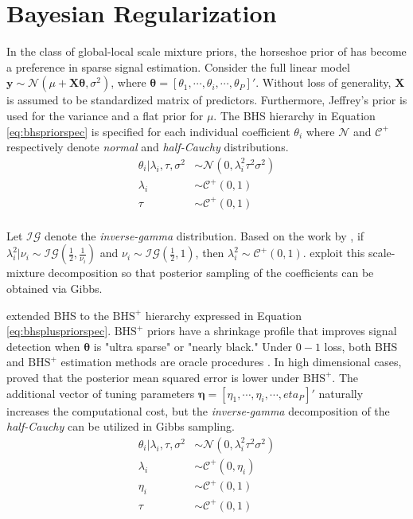 \section{Bayesian Regularization}
\label{sec:bayesreg}
In the class of global-local scale mixture priors, the horseshoe prior of \cite{Carvalho2010} has become a preference in sparse signal estimation. Consider the full linear model $\bm{y}\sim \mathcal{N}(\mu+\bm{X}\bm{\theta},\sigma^2)$, where $\bm{\theta}=[\theta_1, \cdots, \theta_i,\cdots, \theta_P]'$. Without loss of generality,  $\bm{X}$ is assumed to be standardized matrix of predictors. Furthermore, Jeffrey's prior is used for the variance and a flat prior for $\mu$. The BHS hierarchy in Equation \ref{eq:bhspriorspec} is specified for each individual coefficient $\theta_i$ where $\mathcal{N}$ and $\mathcal{C}^+$ respectively denote \textit{normal} and \textit{half-Cauchy} distributions.
\begin{equation}
\label{eq:bhspriorspec}
\begin{split}
	\theta_i|\lambda_i,\tau,\sigma^2 & \sim \mathcal{N}(0,\lambda^2_i\tau^2\sigma^2) \\
	\lambda_i &\sim \mathcal{C}^+(0,1)\\
	\tau &\sim \mathcal{C}^+(0,1)\\
\end{split}
\end{equation}

Let $\mathcal{IG}$ denote the \textit{inverse-gamma} distribution. Based on the work by \cite{Wand2011}, if $\lambda_i^2|\nu_i\sim \mathcal{IG}(\frac{1}{2},\frac{1}{\nu_i})$ and $\nu_i \sim \mathcal{IG}(\frac{1}{2},1)$, then $\lambda_i^2 \sim \mathcal{C}^+(0,1)$. \cite{Makalic2016b} exploit this scale-mixture decomposition so that posterior sampling of the coefficients can be obtained via Gibbs.

\cite{Bhadra2016} extended BHS to the $\textrm{BHS}^+$ hierarchy expressed in Equation \ref{eq:bhspluspriorspec}. $\textrm{BHS}^+$ priors have a shrinkage profile that improves signal detection when $\bm{\theta}$ is "ultra sparse" or "nearly black." Under $0-1$ loss, both BHS and $\textrm{BHS}^+$ estimation methods are oracle procedures \citep{Datta2013,Bhadra2016}. In high dimensional cases, \cite{Bhadra2016} proved that the posterior mean squared error is lower under $\textrm{BHS}^+$. The additional vector of tuning parameters $\bm{\eta}=[\eta_1,\cdots,\eta_i,\cdots,eta_P]'$ naturally increases the computational cost, but the \textit{inverse-gamma} decomposition of the \textit{half-Cauchy} can be utilized in Gibbs sampling. 
\begin{equation}
\label{eq:bhspluspriorspec}
\begin{split}
	\theta_i|\lambda_i,\tau,\sigma^2 & \sim \mathcal{N}(0,\lambda^2_i\tau^2\sigma^2) \\
	\lambda_i &\sim \mathcal{C}^+(0,\eta_i)\\
	\eta_i & \sim \mathcal{C}^+(0,1)\\
	\tau &\sim \mathcal{C}^+(0,1)\\
\end{split}
\end{equation}

